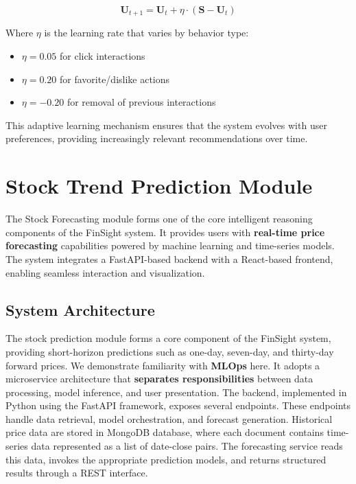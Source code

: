 \begin{equation}
\mathbf{U}_{t+1} = \mathbf{U}_t + \eta \cdot (\mathbf{S} - \mathbf{U}_t)
\end{equation}

Where $\eta$ is the learning rate that varies by behavior type:
\begin{itemize}
\item $\eta = 0.05$ for click interactions
\item $\eta = 0.20$ for favorite/dislike actions
\item $\eta = -0.20$ for removal of previous interactions
\end{itemize}

This adaptive learning mechanism ensures that the system evolves with user preferences, providing increasingly relevant recommendations over time.




\section{Stock Trend Prediction Module}

The Stock Forecasting module forms one of the core intelligent reasoning components of the FinSight system. 
It provides users with \textbf{real-time price forecasting} capabilities powered by machine learning and time-series models.
The system integrates a FastAPI-based backend with a React-based frontend, enabling seamless interaction and visualization.

\subsection{System Architecture}

The stock prediction module forms a core component of the FinSight system, providing short-horizon predictions such as one-day, seven-day, and thirty-day forward prices.  
We demonstrate familiarity with \textbf{\acf{MLOps}} here. It adopts a microservice architecture that \textbf{separates responsibilities} between data processing, model inference, and user presentation.  
The backend, implemented in Python using the FastAPI framework, exposes several endpoints.
These endpoints handle data retrieval, model orchestration, and forecast generation.  
Historical price data are stored in MongoDB database, where each document contains time-series data represented as a list of date-close pairs.  
The forecasting service reads this data, invokes the appropriate prediction models, and returns structured results through a REST interface.

